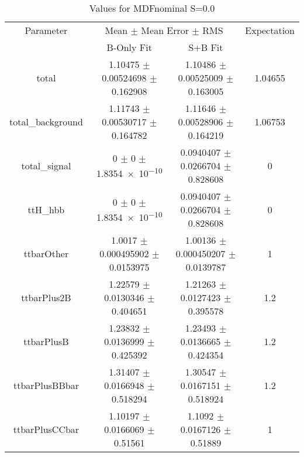 \begin{table}
\centering
\caption{Values for MDFnominal S=0.0}
\begin{tabular}{cccc}
\toprule
Parameter & \multicolumn{2}{c}{Mean $\pm$ Mean Error $\pm$ RMS} & Expectation\\
 & B-Only Fit & S+B Fit & \\
\midrule
total & \num{1.10475} $\pm$ \num{0.00524698} $\pm$ \num{0.162908} & \num{1.10486} $\pm$ \num{0.00525009} $\pm$ \num{0.163005} & \num{1.04655}\\
total\_background & \num{1.11743} $\pm$ \num{0.00530717} $\pm$ \num{0.164782} & \num{1.11646} $\pm$ \num{0.00528906} $\pm$ \num{0.164219} & \num{1.06753}\\
total\_signal & \num{0} $\pm$ \num{0} $\pm$ \num{1.8354e-10} & \num{0.0940407} $\pm$ \num{0.0266704} $\pm$ \num{0.828608} & \num{0}\\
ttH\_hbb & \num{0} $\pm$ \num{0} $\pm$ \num{1.8354e-10} & \num{0.0940407} $\pm$ \num{0.0266704} $\pm$ \num{0.828608} & \num{0}\\
ttbarOther & \num{1.0017} $\pm$ \num{0.000495902} $\pm$ \num{0.0153975} & \num{1.00136} $\pm$ \num{0.000450207} $\pm$ \num{0.0139787} & \num{1}\\
ttbarPlus2B & \num{1.22579} $\pm$ \num{0.0130346} $\pm$ \num{0.404651} & \num{1.21263} $\pm$ \num{0.0127423} $\pm$ \num{0.395578} & \num{1.2}\\
ttbarPlusB & \num{1.23832} $\pm$ \num{0.0136999} $\pm$ \num{0.425392} & \num{1.23493} $\pm$ \num{0.0136665} $\pm$ \num{0.424354} & \num{1.2}\\
ttbarPlusBBbar & \num{1.31407} $\pm$ \num{0.0166948} $\pm$ \num{0.518294} & \num{1.30547} $\pm$ \num{0.0167151} $\pm$ \num{0.518924} & \num{1.2}\\
ttbarPlusCCbar & \num{1.10197} $\pm$ \num{0.0166069} $\pm$ \num{0.51561} & \num{1.1092} $\pm$ \num{0.0167126} $\pm$ \num{0.51889} & \num{1}\\
\bottomrule
\end{tabular}
\end{table}